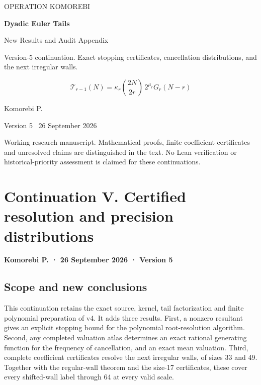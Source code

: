 \documentclass[11pt,letterpaper]{article}
\begin{document}
\hypersetup{pageanchor=false}
\begin{titlepage}
\thispagestyle{empty}
\vspace*{0.65in}
{\sffamily\large OPERATION KOMOREBI\par}
\vspace{0.55in}
{\sffamily\fontsize{31}{36}\selectfont\bfseries Dyadic Euler Tails\par}
\vspace{0.20in}
{\sffamily\fontsize{20}{25}\selectfont New Results and Audit Appendix\par}
\vspace{0.38in}
{\large Version-5 continuation. Exact stopping certificates, cancellation distributions, and the next irregular walls.\par}
\vspace{0.45in}
\[
\mathcal T_{r-1}(N)
=\kappa_r\binom{2N}{2r}\,2^{\mu_r}G_r(N-r)
\]
\vfill
{\large Komorebi P.\par}
\vspace{0.14in}
{\sffamily Version 5 \textbar\ 26 September 2026\par}
\vspace{0.35in}
\begin{minipage}{0.94\textwidth}
\small
Working research manuscript. Mathematical proofs, finite coefficient certificates and unresolved claims are distinguished in the text. No Lean verification or historical-priority assessment is claimed for these continuations.
\end{minipage}
\end{titlepage}
\hypersetup{pageanchor=true}
\tableofcontents
\clearpage
{}
\section{Continuation V. Certified resolution and precision distributions}\label{continuation-v.-certified-resolution-and-precision-distributions}

\textbf{Komorebi P. · 26 September 2026 · Version 5}

\subsection{Scope and new conclusions}\label{scope-and-new-conclusions}

This continuation retains the exact source, kernel, tail factorization and finite polynomial preparation of v4. It adds three results. First, a nonzero resultant gives an explicit stopping bound for the polynomial root-resolution algorithm. Second, any completed valuation atlas determines an exact rational generating function for the frequency of cancellation, and an exact mean valuation. Third, complete coefficient certificates resolve the next irregular walls, of sizes 33 and 49. Together with the regular-wall theorem and the size-17 certificates, these cover every shifted-wall label through 64 at every valid scale.
\end{document}
